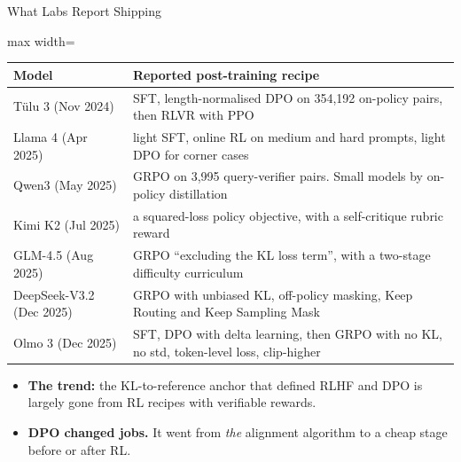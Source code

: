 \begin{frame}{What Labs Report Shipping}
    \begin{center}
    \footnotesize
    \renewcommand{\arraystretch}{1.2}
    \begin{adjustbox}{max width=\linewidth}\begin{tabular}{l>{\raggedright\arraybackslash}p{10.6cm}}
        \toprule
        \textbf{Model} & \textbf{Reported post-training recipe} \\
        \midrule
        T\"ulu 3 (Nov 2024) & SFT, length-normalised DPO on 354,192 on-policy pairs, then RLVR with PPO \\
        Llama 4 (Apr 2025) & light SFT, online RL on medium and hard prompts, light DPO for corner cases \\
        Qwen3 (May 2025) & GRPO on 3,995 query-verifier pairs. Small models by on-policy distillation \\
        Kimi K2 (Jul 2025) & a squared-loss policy objective, with a self-critique rubric reward \\
        GLM-4.5 (Aug 2025) & GRPO ``excluding the KL loss term'', with a two-stage difficulty curriculum \\
        DeepSeek-V3.2 (Dec 2025) & GRPO with unbiased KL, off-policy masking, Keep Routing and Keep Sampling Mask \\
        \rowcolor{KAUSTcyan!12} Olmo 3 (Dec 2025) & SFT, DPO with delta learning, then GRPO with no KL, no std, token-level loss, clip-higher \\
        \bottomrule
    \end{tabular}\end{adjustbox}
    \end{center}
    \begin{itemize}\itemsep0.35em
        \item \textbf{The trend:} the KL-to-reference anchor that defined RLHF and DPO is largely gone from RL recipes with verifiable rewards.
        \item \textbf{DPO changed jobs.} It went from \emph{the} alignment algorithm to a cheap stage before or after RL.
    \end{itemize}
\end{frame}

